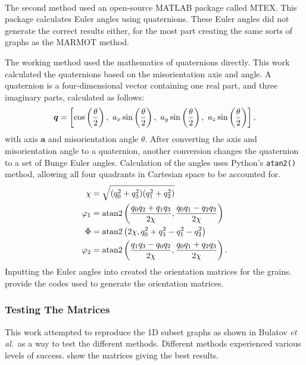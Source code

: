 \documentclass[12pt]{report}
\begin{document}
The second method used an open-source MATLAB\textsuperscript{\textregistered} package called MTEX.\cite{bachmann2010}  This package calculates Euler angles using quaternions.  These Euler angles did not generate the correct results either, for the most part creating the same sorts of graphs as the MARMOT method.

The working method used the mathematics of quaternions directly.\cite{weisstein2004}  This work calculated the quaternions based on the misorientation axis and angle.  A quaternion is a four-dimensional vector containing one real part, and three imaginary parts, calculated as follows:
\begin{equation}
\label{eq:quat}
\bm{q}=\left[\textnormal{cos}\left(\frac{\theta}{2}\right),\ a_x\,\textnormal{sin}\left(\frac{\theta}{2}\right),\ a_y\,\textnormal{sin}\left(\frac{\theta}{2}\right),\ a_z\,\textnormal{sin}\left(\frac{\theta}{2}\right)\right],
\end{equation}
with axis $\bm{a}$ and misorientation angle $\theta$.  After converting the axis and misorientation angle to a quaternion, another conversion changes the quaternion to a set of Bunge Euler angles.  Calculation of the angles uses Python's \lstinline!atan2()! method, allowing all four quadrants in Cartesian space to be accounted for.
\begin{align}
\label{eq:quat2euler}
\begin{aligned}
\chi &= \sqrt{(q_0^2+q_3^2)(q_1^2+q_2^2)}\\
\varphi_1 &= \textnormal{atan2}\left(\frac{q_0q_2+q_1q_3}{2\chi}, \frac{q_0q_1-q_2q_3}{2\chi}\right)\\
\Phi &= \textnormal{atan2}\left(2\chi, q_0^2+q_3^2-q_1^2-q_2^2\right)\\
\varphi_2 &= \textnormal{atan2}\left(\frac{q_1q_3-q_0q_2}{2\chi}, \frac{q_0q_1+q_2q_3}{2\chi}\right).
\end{aligned}
\end{align}
Inputting the Euler angles into  created the orientation matrices for the grains.   provide the codes used to generate the orientation matrices.

\subsubsection{Testing The Matrices\label{PQ:Testing}}
This work attempted to reproduce the 1D subset graphs as shown in Bulatov \emph{et al.}\ as a way to test the different methods.  Different methods experienced various levels of success.   show the matrices giving the best results.
\end{document}
